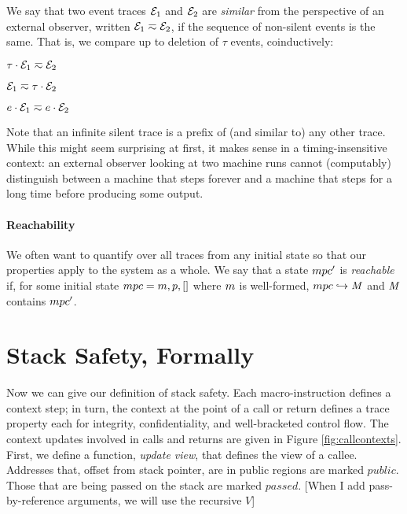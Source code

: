 \documentclass[10pt,conference]{ieeetran}%
\theoremstyle{definition}
\begin{document}
We say that two event traces $\mathcal{E}_1$ and $\mathcal{E}_2$ are {\em similar}
from the perspective of an external observer, written \(\mathcal{E}_1 \eqsim
\mathcal{E}_2\), if the sequence of non-silent events is the same. That is, we
compare up to deletion of \(\tau\) events, coinductively:

\begin{minipage}{.4\columnwidth}
  \judgment{}{\(\obsT \eqsim \obsT\)}
\end{minipage}
\begin{minipage}{.4\columnwidth}
           {\(\tau \cdot \mathcal{E}_1 \eqsim \mathcal{E}_2\)}
\end{minipage}

\begin{minipage}{.4\columnwidth}
           {\(\mathcal{E}_1 \eqsim \tau \cdot \mathcal{E}_2\)}
\end{minipage}
\begin{minipage}{.4\columnwidth}
           {\(e \cdot \mathcal{E}_1 \eqsim e \cdot \mathcal{E}_2\)}
\end{minipage}

Note that an infinite silent trace is a
prefix of (and similar to) any other trace. While this might seem
surprising at first, it makes sense in a timing-insensitive context:
an external observer looking at two machine runs cannot (computably)
distinguish between a machine that steps forever and a machine that
steps for a long time before producing some output.

\paragraph*{Reachability}

We often want to quantify over all traces from any initial state so that our
properties apply to the system as a whole. We say that a state \(mpc'\)
is {\em reachable} if, for some initial state \(mpc = m,p,[]\)
where \(m\) is well-formed, \(mpc \hookrightarrow \mathit{M}\)
and \(\mathit{M}\) contains \(mpc'\).

\section{Stack Safety, Formally}
\label{sec:properties}

Now we can give our definition of stack safety. Each macro-instruction defines a
context step; in turn, the context at the point of a call or return defines a trace
property each for integrity, confidentiality, and well-bracketed control flow.
The context updates involved in calls and returns are given in Figure \ref{fig:callcontexts}.
First, we define a function, {\it update view}, that defines the view of a callee.
Addresses that, offset from stack pointer, are in public regions are marked
\(\mathit{public}\). Those that are being passed on the stack are marked
\(\mathit{passed}\). [When I add pass-by-reference arguments, we will use
the recursive \(V\)]
\end{document}
